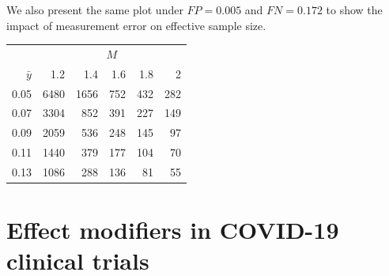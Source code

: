 \documentclass[11pt]{amsart}
\begin{document}
We also present the same plot under $FP = 0.005$ and $FN = 0.172$ to show the impact of measurement error on effective sample size.

\begin{table}[ht]
\centering
\begin{tabular}{rrrrrr}
& \multicolumn{5}{c}{$M$} \\ \cline{2-6}
$\bar y$ & 1.2 & 1.4 & 1.6 & 1.8 & 2 \\
  \hline
0.05 & 6480 & 1656 & 752 & 432 & 282 \\
  0.07 & 3304 & 852 & 391 & 227 & 149 \\
  0.09 & 2059 & 536 & 248 & 145 & 97 \\
  0.11 & 1440 & 379 & 177 & 104 & 70 \\
  0.13 & 1086 & 288 & 136 & 81 & 55 \\
   \hline
\end{tabular}
\end{table}

\section{Effect modifiers in COVID-19 clinical trials}
\end{document}
